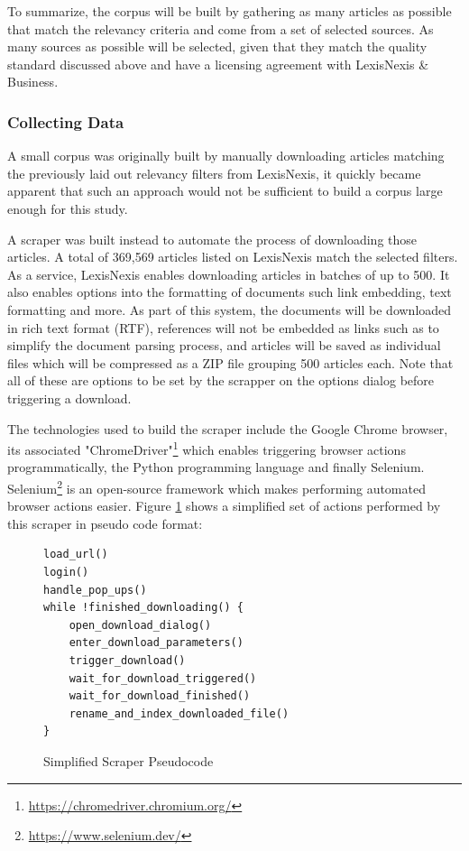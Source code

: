 To summarize, the corpus will be built by gathering as many articles as possible that match the relevancy criteria and come from a set of selected sources. As many sources as possible will be selected, given that they match the quality standard discussed above and have a licensing agreement with LexisNexis \& Business.

\subsubsection{Collecting Data}\label{Collecting Data}

A small corpus was originally built by manually downloading articles matching the previously laid out relevancy filters from LexisNexis, it quickly became apparent that such an approach would not be sufficient to build a corpus large enough for this study.

A scraper was built instead to automate the process of downloading those articles. A total of 369,569 articles listed on LexisNexis match the selected filters. As a service, LexisNexis enables downloading articles in batches of up to 500. It also enables options into the formatting of documents such link embedding, text formatting and more. As part of this system, the documents will be downloaded in rich text format (RTF), references will not be embedded as links such as to simplify the document parsing process, and articles will be saved as individual files which will be compressed as a ZIP file grouping 500 articles each. Note that all of these are options to be set by the scrapper on the options dialog before triggering a download.

The technologies used to build the scraper include the Google Chrome browser, its associated "ChromeDriver"\footnote{\url{https://chromedriver.chromium.org/}} which enables triggering browser actions programmatically, the Python programming language and finally Selenium. Selenium\footnote{\url{https://www.selenium.dev/}} is an open-source framework which makes performing automated browser actions easier. Figure \ref{fig:scraper pseudo code} shows a simplified set of actions performed by this scraper in pseudo code format:

\begin{figure}[H]
\centering
\begin{BVerbatim}
load_url()
login()
handle_pop_ups()
while !finished_downloading() {
    open_download_dialog()
    enter_download_parameters()
    trigger_download()
    wait_for_download_triggered()
    wait_for_download_finished()
    rename_and_index_downloaded_file()
}
\end{BVerbatim}
\caption{Simplified Scraper Pseudocode}
\label{fig:scraper pseudo code}
\end{figure}

